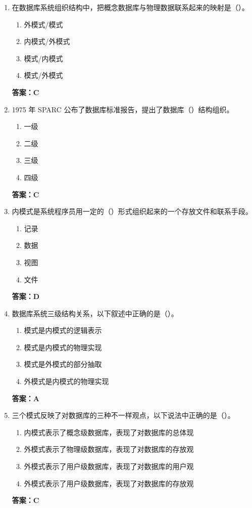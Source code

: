 \documentclass[12pt, a4paper]{article}
\begin{document}
\begin{enumerate}[label=\arabic*.]
	\item 在数据库系统组织结构中，把概念数据库与物理数据联系起来的映射是（\quad）。
	      \begin{enumerate}
		      \item 外模式/模式
		      \item 内模式/外模式
		      \item 模式/内模式
		      \item 模式/外模式
	      \end{enumerate}
	      \textbf{答案：C}

	\item 1975 年 SPARC 公布了数据库标准报告，提出了数据库（\quad）结构组织。
	      \begin{enumerate}
		      \item 一级
		      \item 二级
		      \item 三级
		      \item 四级
	      \end{enumerate}
	      \textbf{答案：C}

	\item 内模式是系统程序员用一定的（\quad）形式组织起来的一个存放文件和联系手段。
	      \begin{enumerate}
		      \item 记录
		      \item 数据
		      \item 视图
		      \item 文件
	      \end{enumerate}
	      \textbf{答案：D}

	\item 数据库系统三级结构关系，以下叙述中正确的是（\quad）。
	      \begin{enumerate}
		      \item 模式是内模式的逻辑表示
		      \item 模式是内模式的物理实现
		      \item 模式是外模式的部分抽取
		      \item 外模式是内模式的物理实现
	      \end{enumerate}
	      \textbf{答案：A}

	\item 三个模式反映了对数据库的三种不一样观点，以下说法中正确的是（\quad）。
	      \begin{enumerate}
		      \item 内模式表示了概念级数据库，表现了对数据库的总体现
		      \item 外模式表示了物理级数据库，表现了对数据库的存放观
		      \item 外模式表示了用户级数据库，表现了对数据库的用户观
		      \item 外模式表示了用户级数据库，表现了对数据库的存放观
	      \end{enumerate}
	      \textbf{答案：C}


\end{enumerate}
\end{document}
